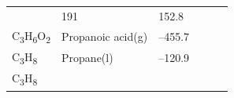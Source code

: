 \documentclass[
  9pt,
]{extbook}
\theoremstyle{definition}
\theoremstyle{definition}
\theoremstyle{definition}
\theoremstyle{remark}
\begin{document}
\begin{longtable}[]{@{}llllll@{}}
\begin{minipage}[t]{0.15\columnwidth}
\strut
\end{minipage} & \begin{minipage}[t]{0.14\columnwidth}\raggedright
191\strut
\end{minipage} & \begin{minipage}[t]{0.14\columnwidth}\raggedright
152.8\strut
\end{minipage}\tabularnewline
\begin{minipage}[t]{0.07\columnwidth}\raggedright
C\textsubscript{3}H\textsubscript{6}O\textsubscript{2}\strut
\end{minipage} & \begin{minipage}[t]{0.17\columnwidth}\raggedright
Propanoic acid(g)\strut
\end{minipage} & \begin{minipage}[t]{0.15\columnwidth}\raggedright
--455.7\strut
\end{minipage} & \begin{minipage}[t]{0.15\columnwidth}\raggedright
\strut
\end{minipage} & \begin{minipage}[t]{0.14\columnwidth}\raggedright
\strut
\end{minipage} & \begin{minipage}[t]{0.14\columnwidth}\raggedright
\strut
\end{minipage}\tabularnewline
\begin{minipage}[t]{0.07\columnwidth}\raggedright
C\textsubscript{3}H\textsubscript{8}\strut
\end{minipage} & \begin{minipage}[t]{0.17\columnwidth}\raggedright
Propane(l)\strut
\end{minipage} & \begin{minipage}[t]{0.15\columnwidth}\raggedright
--120.9\strut
\end{minipage} & \begin{minipage}[t]{0.15\columnwidth}\raggedright
\strut
\end{minipage} & \begin{minipage}[t]{0.14\columnwidth}\raggedright
\strut
\end{minipage} & \begin{minipage}[t]{0.14\columnwidth}\raggedright
\strut
\end{minipage}\tabularnewline
\begin{minipage}[t]{0.07\columnwidth}\raggedright
C\textsubscript{3}H\textsubscript{8}\strut
\end{minipage} & \begin{minipage}[t]{0.17\columnwidth}\raggedright

\end{minipage}
\end{longtable}
\end{document}
